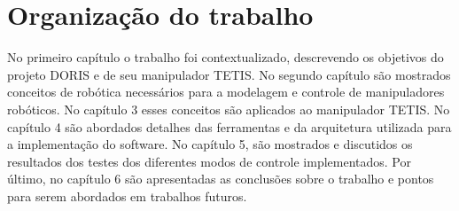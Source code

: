 \section{Organização do trabalho}

No primeiro capítulo o trabalho foi contextualizado, descrevendo os objetivos do projeto DORIS e de seu manipulador TETIS. No segundo capítulo são mostrados conceitos de robótica necessários para a modelagem e controle de manipuladores robóticos. No capítulo 3 esses conceitos são aplicados ao manipulador TETIS. No capítulo 4 são abordados detalhes das ferramentas e da arquitetura utilizada para a implementação do software. No capítulo 5, são mostrados e discutidos os resultados dos testes dos diferentes modos de controle implementados. Por último, no capítulo 6 são apresentadas as conclusões sobre o trabalho e pontos para serem abordados em trabalhos futuros.
